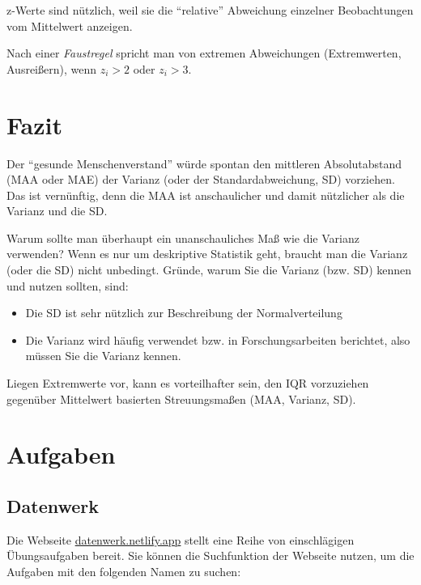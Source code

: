 \documentclass[
  letterpaper,
]{scrbook}
\providecommand{\tightlist}{%
  \setlength{\itemsep}{0pt}\setlength{\parskip}{0pt}}\usepackage{longtable,booktabs,array}
\theoremstyle{definition}
\theoremstyle{definition}
\theoremstyle{definition}
\theoremstyle{remark}
\begin{document}
z-Werte sind nützlich, weil sie die ``relative'' Abweichung einzelner
Beobachtungen vom Mittelwert anzeigen.

Nach einer \emph{Faustregel} spricht man von extremen Abweichungen
(Extremwerten, Ausreißern), wenn \(z_i > 2\) oder \(z_i > 3\).

\section{Fazit}\label{fazit-2}

Der ``gesunde Menschenverstand'' würde spontan den mittleren
Absolutabstand (MAA oder MAE) der Varianz (oder der Standardabweichung,
SD) vorziehen. Das ist vernünftig, denn die MAA ist anschaulicher und
damit nützlicher als die Varianz und die SD.

Warum sollte man überhaupt ein unanschauliches Maß wie die Varianz
verwenden? Wenn es nur um deskriptive Statistik geht, braucht man die
Varianz (oder die SD) nicht unbedingt. Gründe, warum Sie die Varianz
(bzw. SD) kennen und nutzen sollten, sind:

\begin{itemize}
\tightlist
\item
  Die SD ist sehr nützlich zur Beschreibung der Normalverteilung
\item
  Die Varianz wird häufig verwendet bzw. in Forschungsarbeiten
  berichtet, also müssen Sie die Varianz kennen.
\end{itemize}

Liegen Extremwerte vor, kann es vorteilhafter sein, den IQR vorzuziehen
gegenüber Mittelwert basierten Streuungsmaßen (MAA, Varianz, SD).

\section{Aufgaben}\label{aufgaben-5}

\subsection{Datenwerk}\label{datenwerk}

Die Webseite \href{https://datenwerk.netlify.app}{datenwerk.netlify.app}
stellt eine Reihe von einschlägigen Übungsaufgaben bereit. Sie können
die Suchfunktion der Webseite nutzen, um die Aufgaben mit den folgenden
Namen zu suchen:
\end{document}
